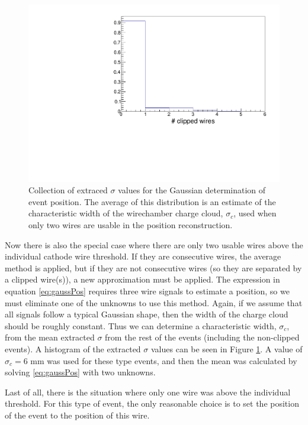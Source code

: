 \begin{figure}[h]
  \centering
  \includegraphics[scale=0.5,page=7]{4-UCNACalibrations/mwpc_position.pdf} 
  \caption{Collection of extraced $\sigma$ values for the Gaussian determination of event position. The
    average of this distribution is an estimate of the characteristic width of the wirechamber charge cloud,
    $\sigma_c$, used when only two wires are usable in the position reconstruction.}
  \label{fig:meanSigma}
\end{figure}

Now there is also the special case where there are only two usable wires above the individual cathode
wire threshold. If they are consecutive wires, the average method is applied, but if they are not consecutive wires
(so they are separated by a clipped wire(s)), a new approximation must be applied. The expression in
equation \ref{eq:gaussPos} requires three wire signals to estimate a position, so we must eliminate one of the unknowns
to use this method. Again, if we assume that all signals follow a typical Gaussian shape, then the width of the
charge cloud should be roughly constant. Thus we can determine a characteristic width, $\sigma_c$, from the
mean extracted $\sigma$ from the rest of the events (including the non-clipped events). A histogram of the
extracted $\sigma$ values can be seen in Figure \ref{fig:meanSigma}. A value of $\sigma_c = 6\text{~mm}$ was used
for these type events, and then the mean was calculated by solving \ref{eq:gaussPos} with two unknowns.

Last of all, there is the situation where only one wire was above the individual threshold. For this type of event,
the only reasonable choice is to set the position of the event to the position of this wire.

